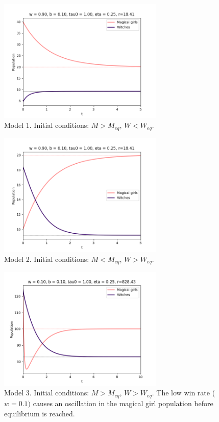 \documentclass[]{article}
\begin{document}
\begin{figure}
	\includegraphics[width=0.7\textwidth]{fig1}
	\centering
	\caption{Model 1. Initial conditions: $M > M_{eq}$, $W < W_{eq}$.}	
	\label{fig1}
\end{figure}

\begin{figure}
	\includegraphics[width=0.7\textwidth]{fig2}
	\centering
	\caption{Model 2. Initial conditions: $M < M_{eq}$, $W > W_{eq}$.}	
	\label{fig2}
\end{figure}

\begin{figure}
	\includegraphics[width=0.7\textwidth]{fig3}
	\centering
	\caption{Model 3. Initial conditions: $M > M_{eq}$, $W > W_{eq}$. The low win rate ($w = 0.1)$ causes an oscillation in the magical girl population before equilibrium is reached.}	
	\label{fig3}
\end{figure}
\end{document}
